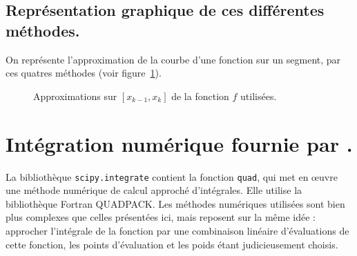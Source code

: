 
\subsection{Représentation graphique de ces différentes méthodes.}
On représente l'approximation de la courbe d'une fonction sur un segment, par ces quatres méthodes (voir figure~\ref{fig.integrales}).

\begin{figure}[!h]
  \begin{center}
    \caption{Approximations sur $[x_{k-1},x_{k}]$ de la fonction $f$ utilisées.}
    \label{fig.integrales}
  \end{center}
\end{figure}

\section{Intégration numérique fournie par \python.}

La bibliothèque \texttt{scipy.integrate} contient la fonction \texttt{quad}, qui met en \oe{}uvre une méthode numérique de calcul approché d'intégrales. 
Elle utilise la bibliothèque Fortran QUADPACK. 
Les méthodes numériques utilisées sont bien plus complexes que celles présentées ici, mais reposent sur la même idée : approcher l'intégrale de la fonction par une combinaison linéaire d'évaluations de cette fonction, les points d'évaluation et les poids étant judicieusement choisis. 

